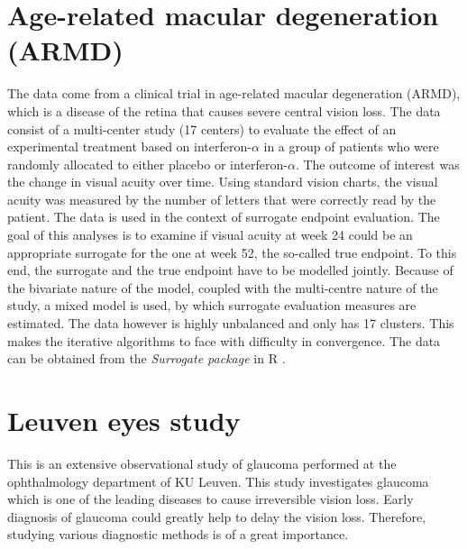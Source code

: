 \documentclass[11pt,a5paper,twoside]{book}
\begin{document}
\section{Age-related macular degeneration (ARMD)} 
\label{sec_armd}
The data come from a clinical trial in age-related macular degeneration (ARMD), which is a disease of the retina that causes severe central vision loss. The data consist of a multi-center study (17 centers) to evaluate the effect of an experimental treatment based on interferon-$\alpha$ in a group of patients who were randomly allocated to either placebo or interferon-$\alpha$. The outcome of interest was the change in visual acuity over time. Using standard vision charts, the visual acuity was measured by the number of letters that were correctly read by the patient. The data is used in the context of surrogate endpoint evaluation. The goal of this analyses is to examine if  visual acuity at week 24 could be an appropriate surrogate for the one at week 52, the so-called true endpoint. To this end, the surrogate and the true endpoint have to be modelled jointly. Because of the bivariate nature of the model, coupled with the multi-centre nature of the study, a mixed model is used, by which surrogate evaluation measures are estimated. The data however is highly unbalanced and only has 17 clusters. This makes the iterative algorithms to face with difficulty in convergence. The data can be obtained from the \emph{Surrogate package} in \textsf{R} \citep{surrogate2016}.
%

\section{Leuven eyes study} 

This is an extensive observational study of glaucoma performed at the ophthalmology department of KU Leuven. This study investigates glaucoma which is one of the leading diseases to cause irreversible vision loss. Early diagnosis of glaucoma could greatly help to delay the vision loss. Therefore, studying various diagnostic methods is of a great importance. 
\end{document}
